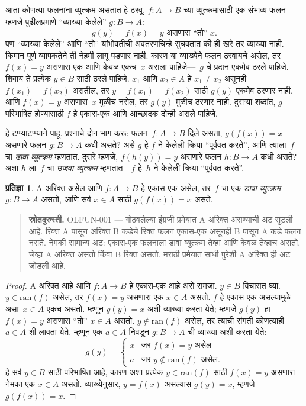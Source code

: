 \documentclass[11pt,a4paper,openany]{book}
\theoremstyle{definition}
\newtheorem{prop}[defn]{प्रतिज्ञा}
\newenvironment{explain}{}{}
\newcommand{\ran}[1]{\mathrm{ran}(#1)}
\begin{document}
\begin{explain}
आता कोणत्या फलनांना व्युत्क्रम असतात हे ठरवू. $f\colon A \to B$
च्या व्युत्क्रमासाठी एक संभाव्य फलन म्हणजे पुढीलप्रमाणे ``व्याख्या केलेले''
$g\colon B \to A$:
\[
g(y) = \text{$f(x) = y$ असणारा ``तो'' $x$.}
\]
पण ``व्याख्या केलेले'' आणि ``तो'' यांभोवतीची अवतरणचिन्हे सुचवतात की
ही खरे तर व्याख्या नाही. किमान पूर्ण व्यापकतेने ती नेहमी लागू पडणार
नाही. कारण या व्याख्येने फलन ठरवायचे असेल, तर $f(x) = y$ असणारा
एक आणि केवळ एकच~$x$ असला पाहिजे---~$g$ चे प्रदान एकमेव ठरले पाहिजे.
शिवाय ते प्रत्येक $y \in B$ साठी ठरले पाहिजे. $x_1$ आणि $x_2 \in A$
हे $x_1 \neq x_2$ असूनही $f(x_1) = f(x_2)$ असतील, तर
$y = f(x_1) = f(x_2)$ साठी $g(y)$ एकमेव ठरणार नाही.
आणि $f(x) = y$ असणारा~$x$ मुळीच नसेल, तर $g(y)$ मुळीच ठरणार नाही.
दुसऱ्या शब्दांत, $g$ परिभाषित होण्यासाठी $f$ हे एकास-एक आणि
आच्छादक दोन्ही असले पाहिजे.

हे टप्प्याटप्प्याने पाहू. प्रश्नाचे दोन भाग करू: फलन~$f\colon A \to B$
दिले असता, $g(f(x)) = x$ असणारे फलन $g\colon B \to A$ कधी असते?
असे $g$ हे $f$ ने केलेली क्रिया ``पूर्ववत करते'', आणि त्याला~$f$ चा
\emph{डावा व्युत्क्रम} म्हणतात. दुसरे म्हणजे, $f(h(y)) = y$ असणारे
फलन $h\colon B \to A$ कधी असते? अशा $h$ ला~$f$ चा
\emph{उजवा व्युत्क्रम} म्हणतात---$f$ हे~$h$ ने केलेली क्रिया ``पूर्ववत करते''.
\end{explain}

\begin{prop}
A अरिक्त असेल आणि $f\colon A \to B$ हे एकास-एक असेल,
तर~$f$ चा एक
\emph{डावा व्युत्क्रम}~$g\colon B \to A$ असतो, आणि सर्व $x \in A$
साठी $g(f(x)) = x$ असते.
\end{prop}
\begin{quote}\small\textbf{स्रोतदुरुस्ती.} OLFUN-001 — गोठवलेल्या इंग्रजी प्रमेयात A अरिक्त असण्याची अट सुटली आहे. रिक्त A पासून अरिक्त B कडेचे रिक्त फलन एकास-एक असूनही B पासून A कडे फलन नसते. नेमकी सामान्य अट: एकास-एक फलनाला डावा व्युत्क्रम तेव्हा आणि केवळ तेव्हाच असतो, जेव्हा A अरिक्त असतो किंवा B रिक्त असतो. मराठी प्रमेयात साधी पुरेशी A अरिक्त ही अट जोडली आहे.\end{quote}

\begin{proof}
A अरिक्त आहे आणि $f\colon A \to B$ हे एकास-एक आहे असे समजा.
$y \in B$ विचारात घ्या.
$y \in \ran{f}$ असेल, तर $f(x) = y$ असणारा एक $x \in A$ असतो.
$f$ हे एकास-एक असल्यामुळे असा~$x \in A$ एकच असतो. म्हणून
$g(y) = x$ अशी व्याख्या करता येते; म्हणजे $g(y)$ हा $f(x) = y$
असणारा ``तो'' $x \in A$ असतो. $y \notin \ran{f}$ असेल, तर त्याची
संगती कोणत्याही~$a \in A$ शी लावता येते. म्हणून एक $a \in A$
निवडून $g\colon B \to A$ ची व्याख्या अशी करता येते:
\[
g(y) = \begin{cases}
    x & \text{जर $f(x) = y$ असेल}\\
    a & \text{जर $y \notin \ran{f}$ असेल.}
\end{cases}
\]
हे सर्व $y \in B$ साठी परिभाषित आहे, कारण अशा प्रत्येक $y \in \ran{f}$
साठी $f(x) = y$ असणारा नेमका एक $x \in A$ असतो. व्याख्येनुसार,
$y = f(x)$ असल्यास $g(y) = x$, म्हणजे $g(f(x)) = x$.
\end{proof}
\end{document}
